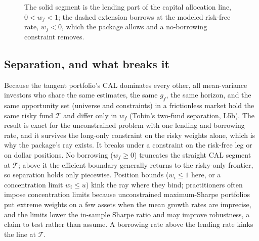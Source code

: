 \documentclass[11pt]{article}
\newcommand{\E}{\mathbb{E}}
\newcommand{\Tan}{\mathcal T}
\begin{document}
\begin{figure}[ht]
  \centering
  \caption{The solid segment is the lending part of the capital allocation line, $0<w_f<1$; the dashed extension borrows at the modeled risk-free rate, $w_f<0$, which the package allows and a no-borrowing constraint removes.}
  \label{fig:constrained-cal}
\end{figure}

\subsection*{Separation, and what breaks it}

Because the tangent portfolio's CAL dominates every other, all mean-variance investors who share the same estimates, the same $g_f$, the same horizon, and the same opportunity set (universe and constraints) in a frictionless market hold the same risky fund $\Tan$ and differ only in $w_f$ (Tobin's two-fund separation, L5b). The result is exact for the unconstrained problem with one lending and borrowing rate, and it survives the long-only constraint on the risky weights alone, which is why the package's ray exists. It breaks under a constraint on the risk-free leg or on dollar positions. No borrowing ($w_f\ge0$) truncates the straight CAL segment at $\Tan$; above it the efficient boundary generally returns to the risky-only frontier, so separation holds only piecewise. Position bounds ($w_i\le1$ here, or a concentration limit $w_i\le u$) kink the ray where they bind; practitioners often impose concentration limits because unconstrained maximum-Sharpe portfolios put extreme weights on a few assets when the mean growth rates are imprecise, and the limits lower the in-sample Sharpe ratio and may improve robustness, a claim to test rather than assume. A borrowing rate above the lending rate kinks the line at $\Tan$.
\end{document}
